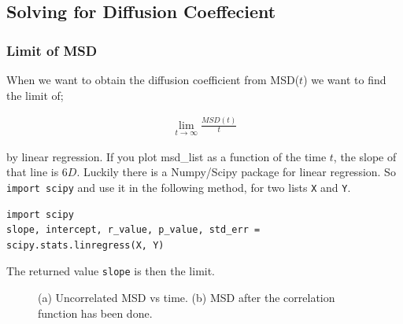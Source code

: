 \documentclass{article}
\newcommand{\code}[1]{\texttt{#1}} %
\begin{document}
\subsection{Solving for Diffusion Coeffecient}

\subsubsection{Limit of MSD}

When we want to obtain the diffusion coefficient from MSD($t$) we
want to find the limit of;

\begin{align}
    \lim_{t\rightarrow \infty} \frac{MSD(t)}{t}
\end{align}

by linear regression. If you plot msd\_list as a function of the time $t$, the slope of that line is $6D$. 
Luckily there is a Numpy/Scipy package for linear regression.
So \code{import scipy} and use it in the following method,
for two lists \code{X} and \code{Y}.\\

\begin{lstlisting}
import scipy
slope, intercept, r_value, p_value, std_err = scipy.stats.linregress(X, Y)
\end{lstlisting}

The returned value \code{slope} is then the limit.

\begin{figure}[htb]
	\centering
  \caption{
    (a) Uncorrelated MSD vs time.
    (b) MSD after the correlation function has been done.
  }
\end{figure}
\end{document}
